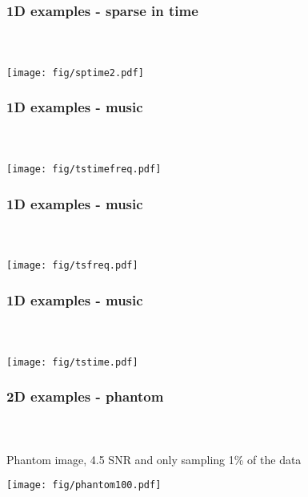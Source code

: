 \begin{frame}[t]
\frametitle{1D examples - sparse in time}
\framesubtitle{~~}  %

\centering
\texttt{[image: fig/sptime2.pdf]}

\end{frame}




\begin{frame}[t]
\frametitle{1D examples - music}
\framesubtitle{~~}  %


\centering
\texttt{[image: fig/tstimefreq.pdf]}

\end{frame}


\begin{frame}[t]
\frametitle{1D examples - music}
\framesubtitle{~~}  %


\centering
\texttt{[image: fig/tsfreq.pdf]}

\end{frame}


\begin{frame}[t]
\frametitle{1D examples - music}
\framesubtitle{~~}  %


\centering
\texttt{[image: fig/tstime.pdf]}

\end{frame}


\begin{frame}[t]
\frametitle{2D examples - phantom}
\framesubtitle{~~}  %

Phantom image, 4.5 SNR and only sampling 1\% of the data

\centering
\texttt{[image: fig/phantom100.pdf]}

\end{frame}

